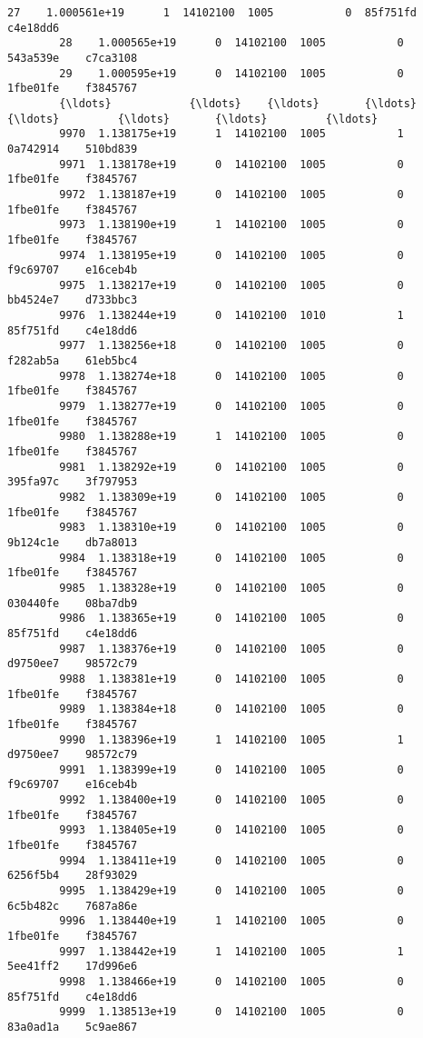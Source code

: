 \documentclass[11pt]{article}
\begin{document}
\begin{Verbatim}[commandchars=\\\{\}]
        27    1.000561e+19      1  14102100  1005           0  85f751fd    c4e18dd6   
        28    1.000565e+19      0  14102100  1005           0  543a539e    c7ca3108   
        29    1.000595e+19      0  14102100  1005           0  1fbe01fe    f3845767   
        {\ldots}            {\ldots}    {\ldots}       {\ldots}   {\ldots}         {\ldots}       {\ldots}         {\ldots}   
        9970  1.138175e+19      1  14102100  1005           1  0a742914    510bd839   
        9971  1.138178e+19      0  14102100  1005           0  1fbe01fe    f3845767   
        9972  1.138187e+19      0  14102100  1005           0  1fbe01fe    f3845767   
        9973  1.138190e+19      1  14102100  1005           0  1fbe01fe    f3845767   
        9974  1.138195e+19      0  14102100  1005           0  f9c69707    e16ceb4b   
        9975  1.138217e+19      0  14102100  1005           0  bb4524e7    d733bbc3   
        9976  1.138244e+19      0  14102100  1010           1  85f751fd    c4e18dd6   
        9977  1.138256e+18      0  14102100  1005           0  f282ab5a    61eb5bc4   
        9978  1.138274e+18      0  14102100  1005           0  1fbe01fe    f3845767   
        9979  1.138277e+19      0  14102100  1005           0  1fbe01fe    f3845767   
        9980  1.138288e+19      1  14102100  1005           0  1fbe01fe    f3845767   
        9981  1.138292e+19      0  14102100  1005           0  395fa97c    3f797953   
        9982  1.138309e+19      0  14102100  1005           0  1fbe01fe    f3845767   
        9983  1.138310e+19      0  14102100  1005           0  9b124c1e    db7a8013   
        9984  1.138318e+19      0  14102100  1005           0  1fbe01fe    f3845767   
        9985  1.138328e+19      0  14102100  1005           0  030440fe    08ba7db9   
        9986  1.138365e+19      0  14102100  1005           0  85f751fd    c4e18dd6   
        9987  1.138376e+19      0  14102100  1005           0  d9750ee7    98572c79   
        9988  1.138381e+19      0  14102100  1005           0  1fbe01fe    f3845767   
        9989  1.138384e+18      0  14102100  1005           0  1fbe01fe    f3845767   
        9990  1.138396e+19      1  14102100  1005           1  d9750ee7    98572c79   
        9991  1.138399e+19      0  14102100  1005           0  f9c69707    e16ceb4b   
        9992  1.138400e+19      0  14102100  1005           0  1fbe01fe    f3845767   
        9993  1.138405e+19      0  14102100  1005           0  1fbe01fe    f3845767   
        9994  1.138411e+19      0  14102100  1005           0  6256f5b4    28f93029   
        9995  1.138429e+19      0  14102100  1005           0  6c5b482c    7687a86e   
        9996  1.138440e+19      1  14102100  1005           0  1fbe01fe    f3845767   
        9997  1.138442e+19      1  14102100  1005           1  5ee41ff2    17d996e6   
        9998  1.138466e+19      0  14102100  1005           0  85f751fd    c4e18dd6   
        9999  1.138513e+19      0  14102100  1005           0  83a0ad1a    5c9ae867   
        

\end{Verbatim}
\end{document}
